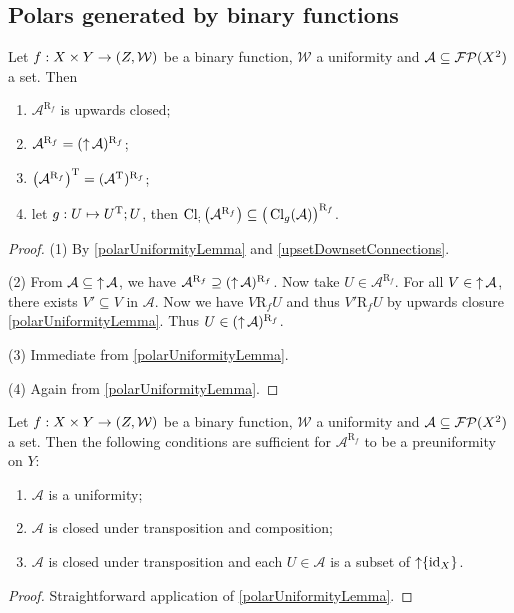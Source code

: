 \subsection{Polars generated by binary functions}
\begin{lemma}
Let $f: X\times Y\to \left( Z, \mathcal{W} \right)$ be a binary function, $\mathcal{W}$ a uniformity and $\mathcal{A}\subseteq \operatorname{\mathcal{FP}}(X^2)$ a set. Then
\begin{enumerate}
\item $\mathcal{A}^{\mathrm{R}_{f}}$ is upwards closed;
\item $\mathcal{A}^{\mathrm{R}_{f}} = (\operatorname{\uparrow} \mathcal{A})^{\mathrm{R}_{f}}$;
\item $\big(\mathcal{A}^{\mathrm{R}_{f}}\big)^{\mathrm{T}} = (\mathcal{A}^{\mathrm{T}})^{\mathrm{R}_{f}}$;
\item let $g: U\mapsto U^{\mathrm{T}};U$, then $\operatorname{Cl}_;\big(\mathcal{A}^{\mathrm{R}_{f}}\big) \subseteq \big(\operatorname{Cl}_g(\mathcal{A})\big)^{\mathrm{R}_{f}}$.
\end{enumerate}
\end{lemma}
\begin{proof}
(1) By \ref{polarUniformityLemma} and \ref{upsetDownsetConnections}.

(2) From $\mathcal{A} \subseteq \operatorname{\uparrow} \mathcal{A}$, we have $\mathcal{A}^{\mathrm{R}_{f}} \supseteq (\operatorname{\uparrow} \mathcal{A})^{\mathrm{R}_{f}}$. Now take $U\in \mathcal{A}^{\mathrm{R}_{f}}$. For all $V\in \operatorname{\uparrow} \mathcal{A}$, there exists $V'\subseteq V$ in $\mathcal{A}$. Now we have $V\mathrel{\mathrm{R}_f}U$ and thus $V'\mathrel{\mathrm{R}_{f}}U$ by upwards closure \ref{polarUniformityLemma}. Thus $U\in (\operatorname{\uparrow} \mathcal{A})^{\mathrm{R}_{f}}$.

(3) Immediate from \ref{polarUniformityLemma}.

(4) Again from \ref{polarUniformityLemma}.
\end{proof}

\begin{proposition}
Let $f: X\times Y\to \left( Z, \mathcal{W} \right)$ be a binary function, $\mathcal{W}$ a uniformity and $\mathcal{A}\subseteq \operatorname{\mathcal{FP}}(X^2)$ a set.
Then the following conditions are sufficient for $\mathcal{A}^{\mathrm{R}_{f}}$ to be a preuniformity on $Y$:
\begin{enumerate}
\item $\mathcal{A}$ is a uniformity;
\item $\mathcal{A}$ is closed under transposition and composition;
\item $\mathcal{A}$ is closed under transposition and each $U\in \mathcal{A}$ is a subset of $\operatorname{\uparrow}\{\operatorname{id}_X\}$.
\end{enumerate}
\end{proposition}
\begin{proof}
Straightforward application of \ref{polarUniformityLemma}.
\end{proof}

